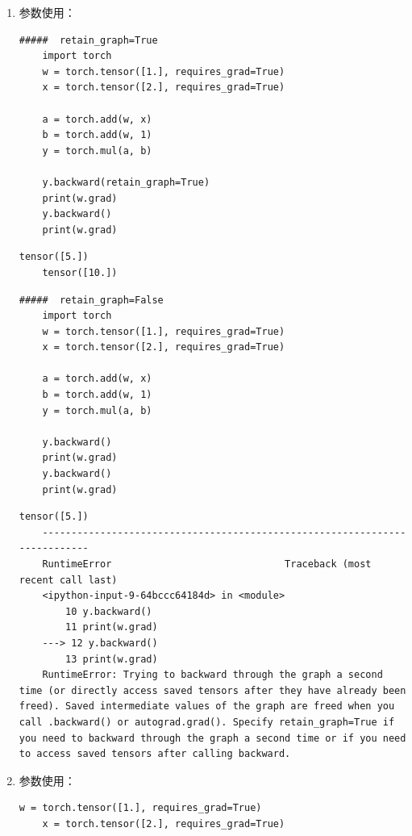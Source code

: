 \begin{enumerate}[label=\arabic*)]
    \item {}参数使用：
    \begin{lstlisting}[style=pythonstyle]
    #####  retain_graph=True
    import torch
    w = torch.tensor([1.], requires_grad=True)
    x = torch.tensor([2.], requires_grad=True)
    
    a = torch.add(w, x)
    b = torch.add(w, 1)
    y = torch.mul(a, b)  
    
    y.backward(retain_graph=True)
    print(w.grad)
    y.backward()
    print(w.grad) 
    \end{lstlisting} 
    \begin{lstlisting}[style=demostyle,numbers=none]
    tensor([5.])
    tensor([10.])
    \end{lstlisting}

    \begin{lstlisting}[style=pythonstyle]
    #####  retain_graph=False
    import torch
    w = torch.tensor([1.], requires_grad=True)
    x = torch.tensor([2.], requires_grad=True)

    a = torch.add(w, x)
    b = torch.add(w, 1)
    y = torch.mul(a, b)

    y.backward()
    print(w.grad)
    y.backward()
    print(w.grad)
    \end{lstlisting}
    \begin{lstlisting}[style=demostyle,numbers=none]
    tensor([5.])
    ---------------------------------------------------------------------------
    RuntimeError                              Traceback (most recent call last)
    <ipython-input-9-64bccc64184d> in <module>
        10 y.backward()
        11 print(w.grad)
    ---> 12 y.backward()
        13 print(w.grad)
    RuntimeError: Trying to backward through the graph a second time (or directly access saved tensors after they have already been freed). Saved intermediate values of the graph are freed when you call .backward() or autograd.grad(). Specify retain_graph=True if you need to backward through the graph a second time or if you need to access saved tensors after calling backward.
    \end{lstlisting}

    \item {}参数使用：
    \begin{lstlisting}[style=pythonstyle]
    w = torch.tensor([1.], requires_grad=True)
    x = torch.tensor([2.], requires_grad=True)
    

\end{lstlisting}
\end{enumerate}
